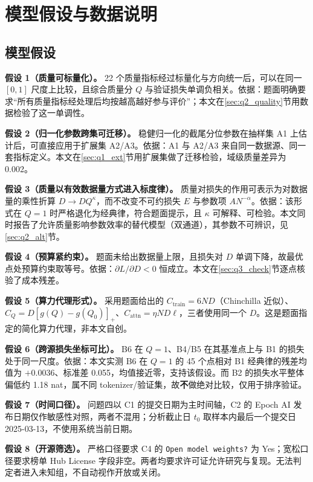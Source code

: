 \section{模型假设与数据说明}
\label{sec:assume}

\subsection{模型假设}

\textbf{假设 1（质量可标量化）。} 22 个质量指标经过标量化与方向统一后，可以在同一 $[0,1]$ 尺度上比较，且综合质量分 $Q$ 与验证损失单调负相关。依据：题面明确要求``所有质量指标经处理后均按越高越好参与评价''；本文在\ref{sec:q2_quality}节用数据检验了这一单调性。

\textbf{假设 2（归一化参数跨集可迁移）。} 稳健归一化的截尾分位参数在抽样集 A1 上估计后，可直接应用于扩展集 A2/A3。依据：A1 与 A2/A3 来自同一数据源、同一套指标定义。本文在\ref{sec:q1_ext}节用扩展集做了迁移检验，域级质量差异为 0.002。

\textbf{假设 3（质量以有效数据量方式进入标度律）。} 质量对损失的作用可表示为对数据量的乘性折算 $D\to DQ^{\kappa}$，而不改变不可约损失 $E$ 与参数项 $AN^{-\alpha}$。依据：该形式在 $Q=1$ 时严格退化为经典律，符合题面提示，且 $\kappa$ 可解释、可检验。本文同时报告了允许质量影响参数效率的替代模型（双通道），其参数不可辨识，见\ref{sec:q2_alt}节。

\textbf{假设 4（预算紧约束）。} 题面未给出数据量上限，且损失对 $D$ 单调下降，故最优点处预算约束取等号。依据：$\partial L/\partial D<0$ 恒成立。本文在\ref{sec:q3_check}节逐点核验了成本残差。

\textbf{假设 5（算力代理形式）。} 采用题面给出的 $C_{\mathrm{train}}=6ND$（Chinchilla 近似）、$C_Q=D[g(Q)-g(Q_0)]_+$、$C_{\mathrm{attn}}=\eta ND\ell$，三者使用同一个 $D$。这是题面指定的简化算力代理，非本文自创。

\textbf{假设 6（跨源损失坐标可比）。} B6 在 $Q=1$、B4/B5 在其基准点上与 B1 的损失处于同一尺度。依据：本文实测 B6 在 $Q=1$ 的 45 个点相对 B1 经典律的残差均值为 $+0.0036$、标准差 0.055，均值接近零，支持该假设。而 B2 的损失水平整体偏低约 1.18 nat，属不同 tokenizer/验证集，故\textbf{不}做绝对比较，仅用于排序验证。

\textbf{假设 7（时间口径）。} 问题四以 C1 的提交日期为主时间轴，C2 的 Epoch AI 发布日期仅作敏感性对照，两者不混用；分析截止日 $t_0$ 取样本内最后一个提交日 2025-03-13，不使用系统当前日期。

\textbf{假设 8（开源筛选）。} 严格口径要求 C4 的 \texttt{Open model weights?} 为 Yes；宽松口径要求榜单 Hub License 字段非空。两者均要求许可证允许研究与复现。无法判定者进入未知组，不自动视作开放或关闭。


